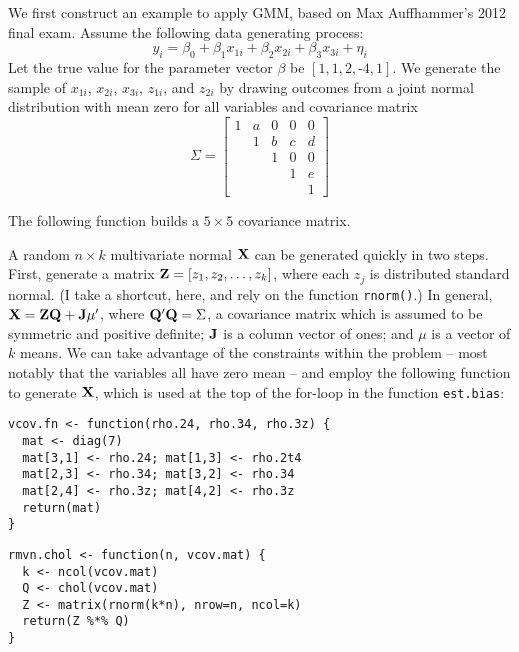 \documentclass{article}
\begin{document}
We first construct an example to apply GMM, based on Max Auffhammer's 2012 final exam.  Assume the following data generating process: 
\begin{equation}
y_i = \beta_0 + \beta_1 x_{1i} + \beta_2 x_{2i} + \beta_3 x_{3i} + \eta_i
\end{equation}
Let the true value for the parameter vector $\beta$ be $[1, 1, 2, \mbox{-}4, 1]$.  We generate the sample of $x_{1i}$,  $x_{2i}$,  $x_{3i}$,  $z_{1i}$, and $z_{2i}$ by drawing outcomes from a joint normal distribution with mean zero for all variables and covariance matrix
\begin{equation}
\Sigma = 
\left[ 
\begin{array}{ccccccc}
1 & a & 0 & 0 & 0 \\
  & 1 & b & c & d \\
  &   & 1 & 0 & 0 \\
  &   &   & 1 & e \\
  &   &   &   & 1
\end{array}
\right] \nonumber
\end{equation}

 The following function builds a $5 \times 5$ covariance matrix.  

A random $n \times k$ multivariate normal ${\bf X}$ can be generated quickly in two steps.  First, generate a matrix ${\bf Z} = [z_1, z_2, \ldots, z_k]$, where each $z_j$ is distributed standard normal.  (I take a shortcut, here, and rely on the \R function \texttt{rnorm()}.)  In general, ${\bf X} = {\bf Z}{\bf Q} + {\bf J}\mu^{\prime}$, where ${\bf Q}^{\prime}{\bf Q} = \Sigma$, a covariance matrix which is assumed to be symmetric and positive definite; ${\bf J}$ is a column vector of ones; and $\mu$ is a vector of $k$ means.  We can take advantage of the constraints within the problem -- most notably that the variables all have zero mean -- and employ the following function to generate ${\bf X}$, which is used at the top of the for-loop in the function \texttt{est.bias}:


\begin{verbatim}
vcov.fn <- function(rho.24, rho.34, rho.3z) {
  mat <- diag(7)
  mat[3,1] <- rho.24; mat[1,3] <- rho.2t4
  mat[2,3] <- rho.34; mat[3,2] <- rho.34
  mat[2,4] <- rho.3z; mat[4,2] <- rho.3z
  return(mat)
}
\end{verbatim}


\begin{verbatim}
rmvn.chol <- function(n, vcov.mat) {
  k <- ncol(vcov.mat)
  Q <- chol(vcov.mat)
  Z <- matrix(rnorm(k*n), nrow=n, ncol=k)
  return(Z %*% Q)
}
\end{verbatim}
\end{document}
